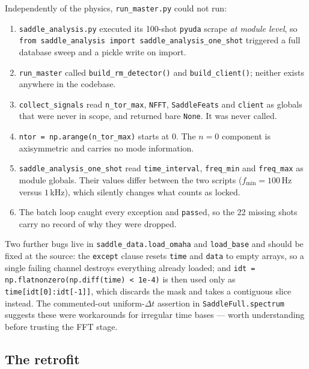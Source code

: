 \documentclass[11pt,a4paper]{article}
\newcommand{\code}[1]{\texttt{\small #1}}
\begin{document}
Independently of the physics, \code{run\_master.py} could not run:

\begin{enumerate}[leftmargin=2em,noitemsep]
\item \code{saddle\_analysis.py} executed its 100-shot \code{pyuda} scrape \emph{at module
level}, so \code{from saddle\_analysis import saddle\_analysis\_one\_shot} triggered a full
database sweep and a pickle write on import.
\item \code{run\_master} called \code{build\_rm\_detector()} and \code{build\_client()};
neither exists anywhere in the codebase.
\item \code{collect\_signals} read \code{n\_tor\_max}, \code{NFFT}, \code{SaddleFeats} and
\code{client} as globals that were never in scope, and returned bare \code{None}. It was
never called.
\item \code{ntor = np.arange(n\_tor\_max)} starts at $0$. The $n=0$ component is
axisymmetric and carries no mode information.
\item \code{saddle\_analysis\_one\_shot} read \code{time\_interval}, \code{freq\_min} and
\code{freq\_max} as module globals. Their values differ between the two scripts
($f_{\min} = 100$\,Hz versus $1$\,kHz), which silently changes what counts as locked.
\item The batch loop caught every exception and \code{pass}ed, so the 22 missing shots
carry no record of why they were dropped.
\end{enumerate}

Two further bugs live in \code{saddle\_data.load\_omaha} and \code{load\_base} and should be
fixed at the source: the \code{except} clause resets \code{time} and \code{data} to empty
arrays, so a single failing channel destroys everything already loaded; and
\code{idt = np.flatnonzero(np.diff(time) < 1e-4)} is then used only as
\code{time[idt[0]:idt[-1]]}, which discards the mask and takes a contiguous slice instead.
The commented-out uniform-$\Delta t$ assertion in \code{SaddleFull.spectrum} suggests these
were workarounds for irregular time bases --- worth understanding before trusting the FFT
stage.

\subsection{The retrofit}
\end{document}
